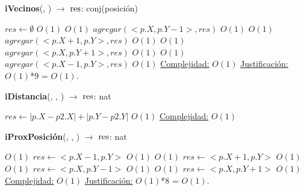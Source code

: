 \begin{Algoritmos}
\begin{algorithm}[H]{\textbf{iVecinos}(, ) $\to$ $\res$: conj(posici\'on)}
	\begin{algorithmic}
       	\State $res \gets \emptyset$	\Comment $O(1)$
        	\Comment $O(1)$
        	\State $agregar(<p.X,p.Y-1>,res)$	\Comment $O(1)$
        \EndIf
        	\Comment $O(1)$
        	\State $agregar(<p.X+1,p.Y>,res)$	\Comment $O(1)$
        \EndIf
        	\Comment $O(1)$
        	\State $agregar(<p.X,p.Y+1>,res)$	\Comment $O(1)$
        \EndIf
        	\Comment $O(1)$
        	\State $agregar(<p.X-1,p.Y>,res)$	\Comment $O(1)$
        \EndIf
	\Statex \underline{Complejidad:} $O(1)$
	\Statex \underline{Justificación:} $O(1)$*9 = $O(1)$.
	\end{algorithmic}
\end{algorithm}




\begin{algorithm}[H]{\textbf{iDistancia}(, , ) $\to$ $\res$: nat}
	\begin{algorithmic}
       	\State $res \gets |p.X - p2.X| + |p.Y - p2.Y|$ \Comment $O(1)$
	\Statex \underline{Complejidad:} $O(1)$
	\Statex
	\end{algorithmic}
\end{algorithm}

\begin{algorithm}[H]{\textbf{iProxPosici\'on}(, , ) $\to$ $\res$: nat}
	\begin{algorithmic}
       		\Comment $O(1)$
        	\State $res \gets <p.X-1,p.Y>$	\Comment $O(1)$
        \EndIf
        	\Comment $O(1)$
        	\State $res \gets <p.X+1,p.Y>$	\Comment $O(1)$
        \EndIf
        	\Comment $O(1)$
        	\State $res \gets <p.X,p.Y-1>$	\Comment $O(1)$
        \EndIf
        	\Comment $O(1)$
        	\State $res \gets <p.X,p.Y+1>$	\Comment $O(1)$
        \EndIf
	\Statex \underline{Complejidad:} $O(1)$
	\Statex \underline{Justificación:} $O(1)$*8 = $O(1)$.
	\end{algorithmic}
\end{algorithm}



\end{Algoritmos}
